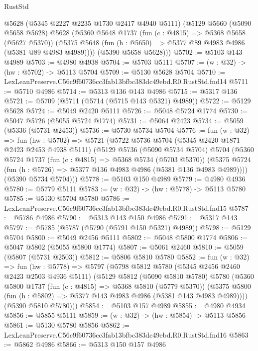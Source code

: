 \begin{lexlean}{RustStd}
\begin{coremodule}
      @5628
      (@5345 @2227 @2235 @1730 @2417 @4940 @5111)
      (@5129
        @5660
        (@5090 @5658 @5628)
        @5628
        (@5360
          @5648
          @1737
          (fun (c : @4815) => @5368 @5658 (@5627 @5370))
          (@5375 @5648 (fun (h : @5650) => @5377 @89 @4983 @4986 (@5381 @89 @4983 @4989))))
        (@5390 @5658 @5628)))
@5702 := @5103 @143 @4989
@5703 := @4980 @4938
@5704 := @5703 @5111
@5707 := (w : @32) -> (hw : @5702) -> @5113 @5704
@5709 := @5130 @5628 @5704
@5710 := LexLeanPreserve.C56c9f60736cc3fab13bfbc383dc49ebd.R0.RustStd.fnd14
@5711 := @5710 @4986
@5714 := @5313 @136 @143 @4986
@5715 := @5317 @136
@5721 := @5709 (@5711 (@5714 (@5715 @143 @5321) @4989))
@5722 := @5129 @5628
@5724 := @5049 @2420 @5111
@5726 := @5048 @5724 @1774
@5730 := @5047 @5726 (@5055 @5724 @1774)
@5731 := @5064 @2423
@5734 := @5059 (@5336 (@5731 @2453))
@5736 := @5730 @5734 @5704
@5776 := fun (w : @32) =>
  fun (hw : @5702) =>
  @5721
    (@5722
      @5736
      @5704
      (@5345 @2420 @1871 @2423 @2453 @4938 @5111)
      (@5129
        @5736
        (@5090 @5734 @5704)
        @5704
        (@5360
          @5724
          @1737
          (fun (c : @4815) => @5368 @5734 (@5703 @5370))
          (@5375 @5724 (fun (h : @5726) => @5377 @136 @4983 @4986 (@5381 @136 @4983 @4989))))
        (@5390 @5734 @5704)))
@5778 := @5103 @150 @4989
@5779 := @4980 @4936
@5780 := @5779 @5111
@5783 := (w : @32) -> (hw : @5778) -> @5113 @5780
@5785 := @5130 @5704 @5780
@5786 := LexLeanPreserve.C56c9f60736cc3fab13bfbc383dc49ebd.R0.RustStd.fnd15
@5787 := @5786 @4986
@5790 := @5313 @143 @150 @4986
@5791 := @5317 @143
@5797 := @5785 (@5787 (@5790 (@5791 @150 @5321) @4989))
@5798 := @5129 @5704
@5800 := @5049 @2456 @5111
@5802 := @5048 @5800 @1774
@5806 := @5047 @5802 (@5055 @5800 @1774)
@5807 := @5061 @2460
@5810 := @5059 (@5807 (@5731 @2503))
@5812 := @5806 @5810 @5780
@5852 := fun (w : @32) =>
  fun (hw : @5778) =>
  @5797
    (@5798
      @5812
      @5780
      (@5345 @2456 @2460 @2423 @2503 @4936 @5111)
      (@5129
        @5812
        (@5090 @5810 @5780)
        @5780
        (@5360
          @5800
          @1737
          (fun (c : @4815) => @5368 @5810 (@5779 @5370))
          (@5375 @5800 (fun (h : @5802) => @5377 @143 @4983 @4986 (@5381 @143 @4983 @4989))))
        (@5390 @5810 @5780)))
@5854 := @5103 @157 @4989
@5855 := @4980 @4934
@5856 := @5855 @5111
@5859 := (w : @32) -> (hw : @5854) -> @5113 @5856
@5861 := @5130 @5780 @5856
@5862 := LexLeanPreserve.C56c9f60736cc3fab13bfbc383dc49ebd.R0.RustStd.fnd16
@5863 := @5862 @4986
@5866 := @5313 @150 @157 @4986

\end{coremodule}
\end{lexlean}
